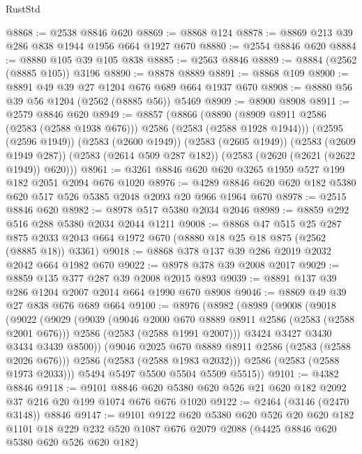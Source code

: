 \begin{lexlean}{RustStd}
\begin{coremodule}
{\begin{coremodule}
{{{{{{{{{{{{{{{@8868 := @2538 @8846 @620
@8869 := @8868 @124
@8878 := @8869 @213 @39 @286 @838 @1944 @1956 @664 @1927 @670
@8880 := @2554 @8846 @620
@8884 := @8880 @105 @39 @105 @838
@8885 := @2563 @8846
@8889 := @8884 (@2562 (@8885 @105)) @3196
@8890 := @8878 @8889
@8891 := @8868 @109
@8900 := @8891 @49 @39 @27 @1204 @676 @689 @664 @1937 @670
@8908 := @8880 @56 @39 @56 @1204 (@2562 (@8885 @56)) @5469
@8909 := @8900 @8908
@8911 := @2579 @8846 @620
@8949 := @8857
    (@8866
      (@8890 (@8909 @8911 @2586 (@2583 (@2588 @1938 @676))) @2586 (@2583 (@2588 @1928 @1944)))
      (@2595 (@2596 @1949))
      (@2583 (@2600 @1949))
      (@2583 (@2605 @1949))
      (@2583 (@2609 @1949 @287))
      (@2583 (@2614 @509 @287 @182))
      (@2583 (@2620 (@2621 (@2622 @1949)) @620)))
@8961 := @3261 @8846 @620 @620 @3265 @1959 @527 @199 @182 @2051 @2094 @676 @1020
@8976 := @4289 @8846 @620 @620 @182 @5380 @620 @517 @526 @5385 @2048 @2093 @20 @966 @1964 @670
@8978 := @2515 @8846 @620
@8982 := @8978 @517 @5380 @2034 @2046
@8989 := @8859 @292 @516 @288 @5380 @2034 @2044 @1211
@9008 := @8868
    @47
    @515
    @25
    @287
    @875
    @2033
    @2043
    @664
    @1972
    @670
    (@8880 @18 @25 @18 @875 (@2562 (@8885 @18)) @3361)
@9018 := @8868 @378 @137 @39 @286 @2019 @2032 @2042 @664 @1982 @670
@9022 := @8978 @378 @39 @2008 @2017
@9029 := @8859 @135 @377 @287 @39 @2008 @2015 @893
@9039 := @8891 @137 @39 @286 @1204 @2007 @2014 @664 @1990 @670 @8908
@9046 := @8869 @49 @39 @27 @838 @676 @689 @664
@9100 := @8976
    (@8982
      (@8989
        (@9008
          (@9018
            (@9022
              (@9029
                (@9039
                  (@9046 @2000 @670 @8889 @8911 @2586 (@2583 (@2588 @2001 @676)))
                  @2586
                  (@2583 (@2588 @1991 @2007)))
                @3424
                @3427
                @3430
                @3434
                @3439
                @8500))
            (@9046 @2025 @670 @8889 @8911 @2586 (@2583 (@2588 @2026 @676)))
            @2586
            (@2583 (@2588 @1983 @2032)))
          @2586
          (@2583 (@2588 @1973 @2033)))
        @5494
        @5497
        @5500
        @5504
        @5509
        @5515))
@9101 := @4382 @8846
@9118 := @9101
    @8846
    @620
    @5380
    @620
    @526
    @21
    @620
    @182
    @2092
    @37
    @216
    @20
    @199
    @1074
    @676
    @676
    @1020
@9122 := @2464 (@3146 (@2470 @3148)) @8846
@9147 := @9101
    @9122
    @620
    @5380
    @620
    @526
    @20
    @620
    @182
    @1101
    @18
    @229
    @232
    @520
    @1087
    @676
    @2079
    @2088
    (@4425 @8846 @620 @5380 @620 @526 @620 @182)
}}}}}}}}}}}}}}}
\end{coremodule}}
\end{coremodule}
\end{lexlean}

